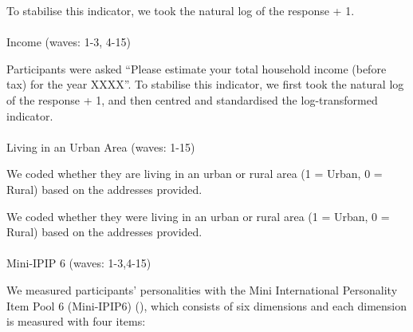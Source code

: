 \documentclass[
  singlecolumn]{article}
\makeatletter
\let\oldparagraph\paragraph
\renewcommand{\paragraph}{
    \@ifstar
      \xxxParagraphStar
      \xxxParagraphNoStar
  }
\newcommand{\xxxParagraphStar}[1]{\oldparagraph*{#1}\mbox{}}
\newcommand{\xxxParagraphNoStar}[1]{\oldparagraph{#1}\mbox{}}
\makeatother
\begin{document}
To stabilise this indicator, we took the natural log of the response +
1.

\paragraph{Income (waves: 1-3, 4-15)}\label{income-waves-1-3-4-15}

Participants were asked ``Please estimate your total household income
(before tax) for the year XXXX''. To stabilise this indicator, we first
took the natural log of the response + 1, and then centred and
standardised the log-transformed indicator.

\paragraph{Living in an Urban Area (waves:
1-15)}\label{living-in-an-urban-area-waves-1-15}

We coded whether they are living in an urban or rural area (1 = Urban, 0
= Rural) based on the addresses provided.

We coded whether they were living in an urban or rural area (1 = Urban,
0 = Rural) based on the addresses provided.

\paragraph{Mini-IPIP 6 (waves:
1-3,4-15)}\label{mini-ipip-6-waves-1-34-15}

We measured participants' personalities with the Mini International
Personality Item Pool 6 (Mini-IPIP6) (), which consists of six dimensions and each
dimension is measured with four items:
\end{document}
